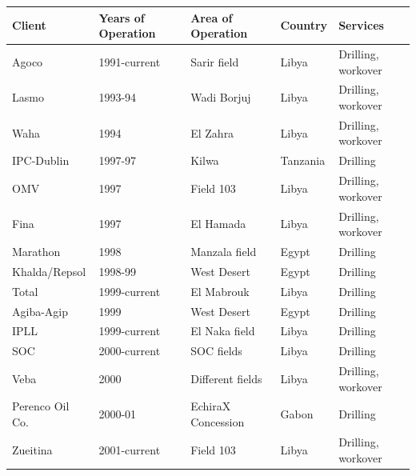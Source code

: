 \documentclass{article}
\begin{document}
\begin{tabular}{lllll}
\toprule
Client & Years of Operation & Area of Operation & Country & Services \\
\midrule
Agoco & 1991-current & Sarir field & Libya & Drilling, workover \\
Lasmo & 1993-94 & Wadi Borjuj & Libya & Drilling, workover \\
Waha & 1994 & El Zahra & Libya & Drilling, workover \\
IPC-Dublin & 1997-97 & Kilwa & Tanzania & Drilling \\
OMV & 1997 & Field 103 & Libya & Drilling, workover \\
Fina & 1997 & El Hamada & Libya & Drilling, workover \\
Marathon & 1998 & Manzala field & Egypt & Drilling \\
Khalda/Repsol & 1998-99 & West Desert & Egypt & Drilling \\
Total & 1999-current & El Mabrouk & Libya & Drilling \\
Agiba-Agip & 1999 & West Desert & Egypt & Drilling \\
IPLL & 1999-current & El Naka field & Libya & Drilling \\
SOC & 2000-current & SOC fields & Libya & Drilling \\
Veba & 2000 & Different fields & Libya & Drilling, workover \\
Perenco Oil Co. & 2000-01 & EchiraX Concession & Gabon & Drilling \\
Zueitina & 2001-current & Field 103 & Libya & Drilling, workover \\
\bottomrule
\end{tabular}
\end{document}
